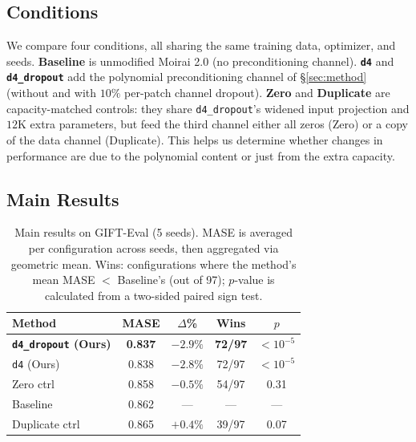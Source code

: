 \documentclass{article}
\begin{document}
\subsection{Conditions}

We compare four conditions, all sharing the same training data, optimizer, and seeds. \textbf{Baseline} is unmodified Moirai 2.0 (no preconditioning channel). \textbf{\texttt{d4}} and \textbf{\texttt{d4\_dropout}} add the polynomial preconditioning channel of \S\ref{sec:method} (without and with $10\%$ per-patch channel dropout). \textbf{Zero} and \textbf{Duplicate} are capacity-matched controls: they share \texttt{d4\_dropout}'s widened input projection and $12$K extra parameters, but feed the third channel either all zeros (Zero) or a copy of the data channel (Duplicate). This helps us determine whether changes in performance are due to the polynomial content or just from the extra capacity.

\subsection{Main Results}

\begin{table}[t]
\caption{Main results on GIFT-Eval (5 seeds). MASE is averaged per configuration across seeds, then aggregated via geometric mean. Wins: configurations where the method's mean MASE $<$ Baseline's (out of 97); $p$-value is calculated from a two-sided paired sign test.}
\label{tab:main}
\vskip 0.1in
\centering
\small
\setlength{\tabcolsep}{3pt}
\begin{tabular}{lcccc}
\toprule
\textbf{Method} & \textbf{MASE} & \textbf{$\Delta$\%} & \textbf{Wins} & \textbf{$p$} \\
\midrule
\textbf{\texttt{d4\_dropout} (Ours)} & \textbf{0.837} & \textbf{$-2.9\%$} & \textbf{72/97} & $< 10^{-5}$ \\
\texttt{d4} (Ours)         & 0.838          & $-2.8\%$       & 72/97 & $< 10^{-5}$ \\
Zero ctrl                  & 0.858          & $-0.5\%$       & 54/97 & 0.31 \\
Baseline                   & 0.862          & ---            & ---   & --- \\
Duplicate ctrl             & 0.865          & $+0.4\%$       & 39/97 & 0.07 \\
\bottomrule
\end{tabular}
\vskip -0.1in
\end{table}
\end{document}
